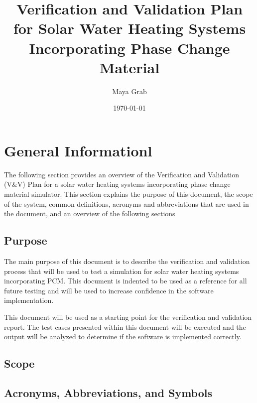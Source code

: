 \documentclass[12pt]{article}
\begin{document}
\title{Verification and Validation Plan for Solar Water Heating Systems Incorporating 
Phase Change Material} 
\author{Maya Grab}
\date{\today}
	
\maketitle

\tableofcontents

%
%

\section{General Informationl}
The following section provides an overview of the Verification and Validation (V\&V) Plan 
for a solar water heating systems incorporating phase change material simulator.
 This section explains the purpose of this document, the scope of the system,
  common definitions, acronyms and abbreviations that are used in the document,
   and an overview of the following sections

\subsection{Purpose}
The main purpose of this document is to describe the verification and validation 
process that will be used to test a simulation for solar water heating systems incorporating PCM.
This document is indented to be used as a reference for all future testing and will
be used to increase confidence in the software implementation.  

This document will be used as a starting point for the verification and validation report. The 
test cases presented within this document will be executed and the output will be analyzed to 
determine if the software is implemented correctly.  


\subsection{Scope}


\subsection{Acronyms, Abbreviations, and Symbols }
\end{document}
